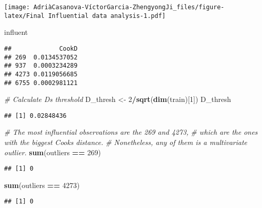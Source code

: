 \documentclass[
]{article}
\newenvironment{Shaded}{\begin{snugshade}}{\end{snugshade}}
\newcommand{\CommentTok}[1]{\textcolor[rgb]{0.56,0.35,0.01}{\textit{#1}}}
\newcommand{\DecValTok}[1]{\textcolor[rgb]{0.00,0.00,0.81}{#1}}
\newcommand{\FunctionTok}[1]{\textcolor[rgb]{0.13,0.29,0.53}{\textbf{#1}}}
\newcommand{\NormalTok}[1]{#1}
\newcommand{\OtherTok}[1]{\textcolor[rgb]{0.56,0.35,0.01}{#1}}
\newcommand{\SpecialCharTok}[1]{\textcolor[rgb]{0.81,0.36,0.00}{\textbf{#1}}}
\begin{document}
\texttt{[image: AdriàCasanova-VíctorGarcia-ZhengyongJi\_files/figure-latex/Final Influential data analysis-1.pdf]}

\begin{Shaded}
\begin{Highlighting}[]
\NormalTok{influent}
\end{Highlighting}
\end{Shaded}

\begin{verbatim}
##             CookD
## 269  0.0134537052
## 937  0.0003234289
## 4273 0.0119056685
## 6755 0.0002981121
\end{verbatim}

\begin{Shaded}
\begin{Highlighting}[]
\CommentTok{\# Calculate D\textquotesingle{}s threshold}
\NormalTok{D\_thresh }\OtherTok{\textless{}{-}} \DecValTok{2}\SpecialCharTok{/}\FunctionTok{sqrt}\NormalTok{(}\FunctionTok{dim}\NormalTok{(train)[}\DecValTok{1}\NormalTok{])}
\NormalTok{D\_thresh}
\end{Highlighting}
\end{Shaded}

\begin{verbatim}
## [1] 0.02848436
\end{verbatim}

\begin{Shaded}
\begin{Highlighting}[]
\CommentTok{\# The most influential observations are the 269 and 4273,}
\CommentTok{\# which are the ones with the biggest Cook\textquotesingle{}s distance.}
\CommentTok{\# Nonetheless, any of them is a multivariate outlier.}
\FunctionTok{sum}\NormalTok{(outliers }\SpecialCharTok{==} \DecValTok{269}\NormalTok{)}
\end{Highlighting}
\end{Shaded}

\begin{verbatim}
## [1] 0
\end{verbatim}

\begin{Shaded}
\begin{Highlighting}[]
\FunctionTok{sum}\NormalTok{(outliers }\SpecialCharTok{==} \DecValTok{4273}\NormalTok{)}
\end{Highlighting}
\end{Shaded}

\begin{verbatim}
## [1] 0
\end{verbatim}
\end{document}
